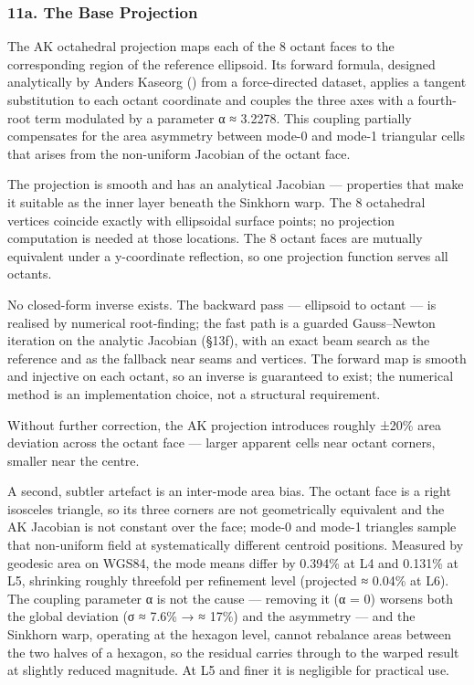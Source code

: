 \documentclass[
  11pt,
  a4paper,
]{article}
\begin{document}
\subsubsection{11a. The Base Projection}\label{a.-the-base-projection}

The AK octahedral projection maps each of the 8 octant faces to the
corresponding region of the reference ellipsoid. Its forward formula,
designed analytically by Anders Kaseorg
() from a force-directed
dataset, applies a tangent substitution to each octant coordinate and
couples the three axes with a fourth-root term modulated by a parameter
α ≈ 3.2278. This coupling partially compensates for the area asymmetry
between mode-0 and mode-1 triangular cells that arises from the
non-uniform Jacobian of the octant face.

The projection is smooth and has an analytical Jacobian --- properties
that make it suitable as the inner layer beneath the Sinkhorn warp. The
8 octahedral vertices coincide exactly with ellipsoidal surface points;
no projection computation is needed at those locations. The 8 octant
faces are mutually equivalent under a y-coordinate reflection, so one
projection function serves all octants.

No closed-form inverse exists. The backward pass --- ellipsoid to octant
--- is realised by numerical root-finding; the fast path is a guarded
Gauss--Newton iteration on the analytic Jacobian (§13f), with an exact
beam search as the reference and as the fallback near seams and
vertices. The forward map is smooth and injective on each octant, so an
inverse is guaranteed to exist; the numerical method is an
implementation choice, not a structural requirement.

Without further correction, the AK projection introduces roughly ±20\%
area deviation across the octant face --- larger apparent cells near
octant corners, smaller near the centre.

A second, subtler artefact is an inter-mode area bias. The octant face
is a right isosceles triangle, so its three corners are not
geometrically equivalent and the AK Jacobian is not constant over the
face; mode-0 and mode-1 triangles sample that non-uniform field at
systematically different centroid positions. Measured by geodesic area
on WGS84, the mode means differ by 0.394\% at L4 and 0.131\% at L5,
shrinking roughly threefold per refinement level (projected ≈ 0.04\% at
L6). The coupling parameter α is not the cause --- removing it (α = 0)
worsens both the global deviation (σ ≈ 7.6\% → ≈ 17\%) and the asymmetry
--- and the Sinkhorn warp, operating at the hexagon level, cannot
rebalance areas between the two halves of a hexagon, so the residual
carries through to the warped result at slightly reduced magnitude. At
L5 and finer it is negligible for practical use.
\end{document}

